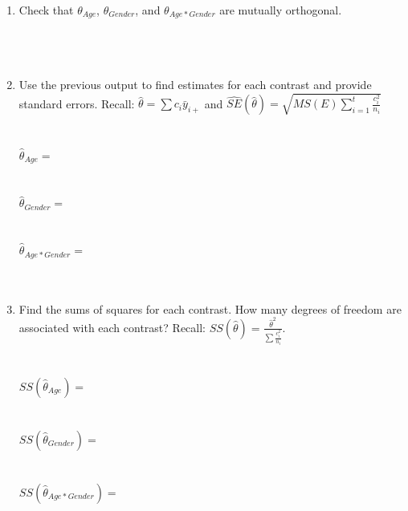 \begin{enumerate}
\item Check that $\theta_{Age}$, $\theta_{Gender}$, and $\theta_{Age*Gender}$ are mutually orthogonal.  \\~\\~\\~\\
\item Use the previous output to find estimates for each contrast and provide standard errors.  Recall: $\hat\theta=\sum c_i \bar{y}_{i+}$ and $\hat{SE}(\hat{\theta})=\sqrt{MS(E)\sum_{i=1}^{t}\frac{c_i^2}{n_i}}$\\~\\~\\
$\hat{\theta}_{Age} = $\\~\\~\\
$\hat{\theta}_{Gender} = $\\~\\~\\
$\hat{\theta}_{Age*Gender} = $\\~\\~\\
\item Find the sums of squares for each contrast.  How many degrees of freedom are associated with each contrast?   Recall: $ SS(\hat\theta) = \frac{\hat\theta^2}{\sum \frac{c_i^2}{n_i}}.$\\~\\~\\
$SS(\hat{\theta}_{Age}) = $\\~\\~\\
$SS(\hat{\theta}_{Gender}) = $\\~\\~\\
$SS(\hat{\theta}_{Age*Gender}) = $\\

\newpage


\end{enumerate}

